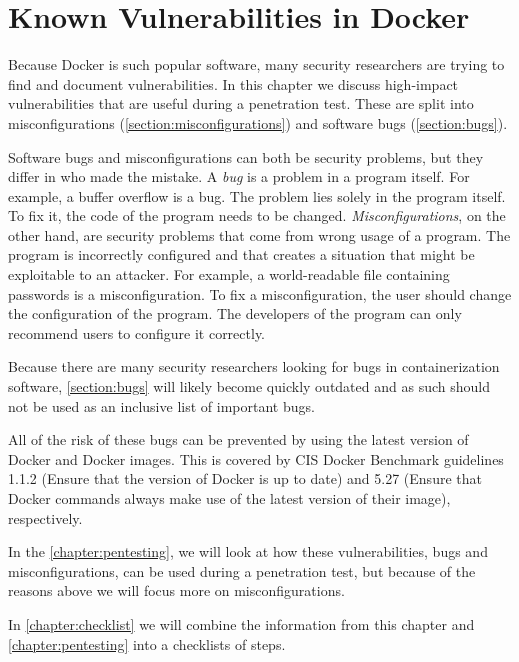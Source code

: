 \chapter{Known Vulnerabilities in Docker}\label{chapter:vulnerabilities}
Because Docker is such popular software, many security researchers are trying to find and document vulnerabilities. In this chapter we discuss high-impact vulnerabilities that are useful during a penetration test. These are split into misconfigurations (\autoref{section:misconfigurations}) and software bugs (\autoref{section:bugs}).

\medskip

Software bugs and misconfigurations can both be security problems, but they differ in who made the mistake. A \emph{bug} is a problem in a program itself. For example, a buffer overflow is a bug. The problem lies solely in the program itself. To fix it, the code of the program needs to be changed. \emph{Misconfigurations}, on the other hand, are security problems that come from wrong usage of a program. The program is incorrectly configured and that creates a situation that might be exploitable to an attacker. For example, a world-readable file containing passwords is a misconfiguration. To fix a misconfiguration, the user should change the configuration of the program. The developers of the program can only recommend users to configure it correctly.

\medskip

Because there are many security researchers looking for bugs in containerization software, \autoref{section:bugs} will likely become quickly outdated and as such should not be used as an inclusive list of important bugs.

All of the risk of these bugs can be prevented by using the latest version of Docker and Docker images. This is covered by CIS Docker Benchmark guidelines 1.1.2 (Ensure that the version of Docker is up to date) and 5.27 (Ensure that Docker commands always make use of the latest version of their image), respectively.

In the \autoref{chapter:pentesting}, we will look at how these vulnerabilities, bugs and misconfigurations, can be used during a penetration test, but because of the reasons above we will focus more on misconfigurations.

\medskip

In \autoref{chapter:checklist} we will combine the information from this chapter and \autoref{chapter:pentesting} into a checklists of steps.



